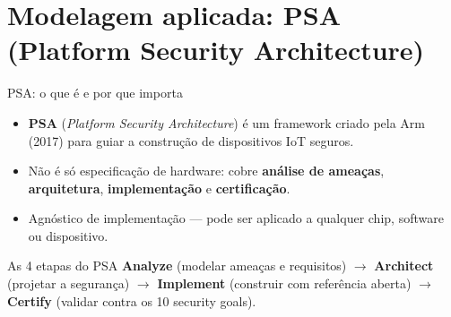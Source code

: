 \documentclass{beamer}
\begin{document}
\section{Modelagem aplicada: PSA (Platform Security Architecture)}

\begin{frame}{PSA: o que é e por que importa}
\begin{itemize}
  \item \textbf{PSA} (\textit{Platform Security Architecture}) é um framework criado pela Arm (2017) para guiar a construção de dispositivos IoT seguros.
  \item Não é só especificação de hardware: cobre \textbf{análise de ameaças}, \textbf{arquitetura}, \textbf{implementação} e \textbf{certificação}.
  \item Agnóstico de implementação --- pode ser aplicado a qualquer chip, software ou dispositivo.
\end{itemize}

\vspace{0.3em}
\begin{block}{As 4 etapas do PSA}
\textbf{Analyze} (modelar ameaças e requisitos) $\rightarrow$
\textbf{Architect} (projetar a segurança) $\rightarrow$
\textbf{Implement} (construir com referência aberta) $\rightarrow$
\textbf{Certify} (validar contra os 10 security goals).
\end{block}
\end{frame}
\end{document}
